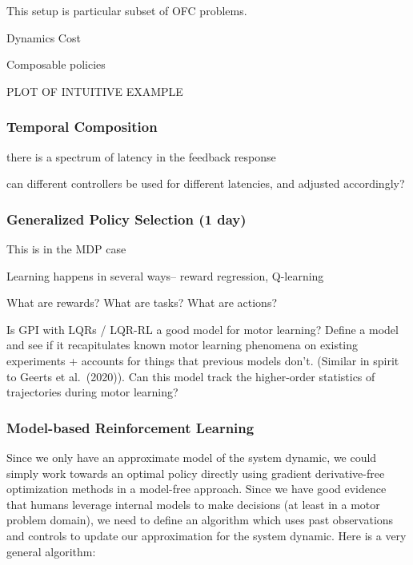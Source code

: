 \documentclass[
  a4paper,
]{article}
\begin{document}
This setup is particular subset of OFC problems.

Dynamics Cost

Composable policies

PLOT OF INTUITIVE EXAMPLE

\hypertarget{temporal-composition}{%
\subsubsection{Temporal Composition}\label{temporal-composition}}

there is a spectrum of latency in the feedback response

can different controllers be used for different latencies, and adjusted
accordingly?

\hypertarget{generalized-policy-selection-1-day}{%
\subsubsection{Generalized Policy Selection (1
day)}\label{generalized-policy-selection-1-day}}

This is in the MDP case

Learning happens in several ways-- reward regression, Q-learning

What are rewards? What are tasks? What are actions?

Is GPI with LQRs / LQR-RL a good model for motor learning? Define a
model and see if it recapitulates known motor learning phenomena on
existing experiments + accounts for things that previous models don't.
(Similar in spirit to Geerts et al.~(2020)). Can this model track the
higher-order statistics of trajectories during motor learning?

\hypertarget{model-based-reinforcement-learning}{%
\subsubsection{Model-based Reinforcement
Learning}\label{model-based-reinforcement-learning}}

Since we only have an approximate model of the system dynamic, we could
simply work towards an optimal policy directly using gradient
derivative-free optimization methods in a model-free approach. Since we
have good evidence that humans leverage internal models to make
decisions (at least in a motor problem domain), we need to define an
algorithm which uses past observations and controls to update our
approximation for the system dynamic. Here is a very general algorithm:
\end{document}
